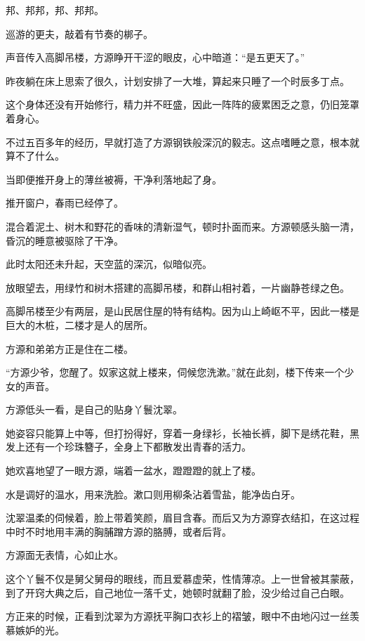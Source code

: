 
\begin{this_body}



邦、邦邦，邦、邦邦。

巡游的更夫，敲着有节奏的梆子。

声音传入高脚吊楼，方源睁开干涩的眼皮，心中暗道：“是五更天了。”

昨夜躺在床上思索了很久，计划安排了一大堆，算起来只睡了一个时辰多丁点。

这个身体还没有开始修行，精力并不旺盛，因此一阵阵的疲累困乏之意，仍旧笼罩着身心。

不过五百多年的经历，早就打造了方源钢铁般深沉的毅志。这点嗜睡之意，根本就算不了什么。

当即便推开身上的薄丝被褥，干净利落地起了身。

推开窗户，春雨已经停了。

混合着泥土、树木和野花的香味的清新湿气，顿时扑面而来。方源顿感头脑一清，昏沉的睡意被驱除了干净。

此时太阳还未升起，天空蓝的深沉，似暗似亮。

放眼望去，用绿竹和树木搭建的高脚吊楼，和群山相衬着，一片幽静苍绿之色。

高脚吊楼至少有两层，是山民居住屋的特有结构。因为山上崎岖不平，因此一楼是巨大的木桩，二楼才是人的居所。

方源和弟弟方正是住在二楼。

“方源少爷，您醒了。奴家这就上楼来，伺候您洗漱。”就在此刻，楼下传来一个少女的声音。

方源低头一看，是自己的贴身丫鬟沈翠。

她姿容只能算上中等，但打扮得好，穿着一身绿衫，长袖长裤，脚下是绣花鞋，黑发上还有一个珍珠簪子，全身上下都散发出青春的活力。

她欢喜地望了一眼方源，端着一盆水，蹬蹬蹬的就上了楼。

水是调好的温水，用来洗脸。漱口则用柳条沾着雪盐，能净齿白牙。

沈翠温柔的伺候着，脸上带着笑颜，眉目含春。而后又为方源穿衣结扣，在这过程中时不时地用丰满的胸脯蹭方源的胳膊，或者后背。

方源面无表情，心如止水。

这个丫鬟不仅是舅父舅母的眼线，而且爱慕虚荣，性情薄凉。上一世曾被其蒙蔽，到了开窍大典之后，自己地位一落千丈，她顿时就翻了脸，没少给过自己白眼。

方正来的时候，正看到沈翠为方源抚平胸口衣衫上的褶皱，眼中不由地闪过一丝羡慕嫉妒的光。


\end{this_body}
